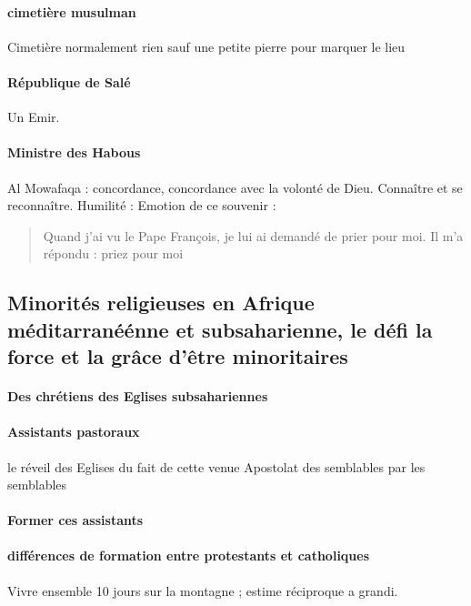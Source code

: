 \paragraph{cimetière musulman}
Cimetière normalement rien sauf une petite pierre pour marquer le lieu 

\paragraph{République de Salé} Un Emir. 





 
\paragraph{Ministre des Habous} Al Mowafaqa : concordance, concordance avec la volonté de Dieu. Connaître et se reconnaître.
Humilité : Emotion de ce souvenir : 
\begin{quote}
Quand j’ai vu le Pape François, je lui ai demandé de prier pour moi.  Il m’a répondu : priez pour moi
\end{quote}

\paragraph{}

\subsection{Minorités religieuses en Afrique méditarranéénne et subsaharienne, le défi la force et la grâce d’être minoritaires}
\paragraph{Des chrétiens des Eglises subsahariennes}
\paragraph{Assistants pastoraux} le réveil des Eglises du fait de cette venue
Apostolat des semblables par les semblables

\paragraph{Former ces assistants}
\paragraph{différences de formation entre protestants et catholiques} Vivre ensemble 10 jours sur la montagne ; estime réciproque a grandi. 
